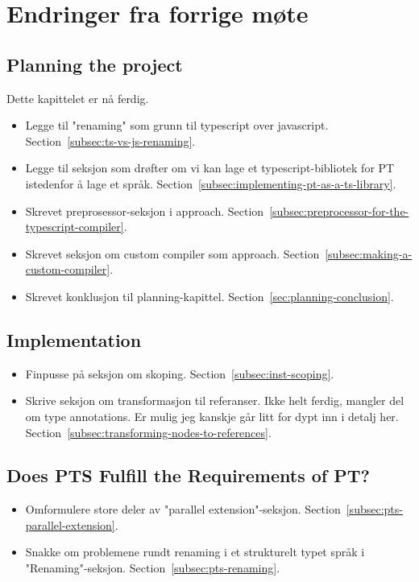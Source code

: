 
\chapter*{Endringer fra forrige møte}

\section*{Planning the project}

Dette kapittelet er nå ferdig.

\begin{itemize}
    \item Legge til "renaming" som grunn til typescript over javascript.
    Section~\vref{subsec:ts-vs-js-renaming}.
    \item Legge til seksjon som drøfter om vi kan lage et typescript-bibliotek for PT istedenfor å lage et språk.
    Section~\vref{subsec:implementing-pt-as-a-ts-library}.
    \item Skrevet preprosessor-seksjon i approach.
    Section~\vref{subsec:preprocessor-for-the-typescript-compiler}.
    \item Skrevet seksjon om custom compiler som approach.
    Section~\vref{subsec:making-a-custom-compiler}.
    \item Skrevet konklusjon til planning-kapittel.
    Section~\vref{sec:planning-conclusion}.
\end{itemize}

\section*{Implementation}

\begin{itemize}
    \item Finpusse på seksjon om skoping.
    Section~\vref{subsec:inst-scoping}.
    \item Skrive seksjon om transformasjon til referanser.
    Ikke helt ferdig, mangler del om type annotations.
    Er mulig jeg kanskje går litt for dypt inn i detalj her.
    Section~\vref{subsec:transforming-nodes-to-references}.
\end{itemize}

\section*{Does PTS Fulfill the Requirements of PT?}

\begin{itemize}
    \item Omformulere store deler av "parallel extension"-seksjon.
    Section~\vref{subsec:pts-parallel-extension}.
    \item Snakke om problemene rundt renaming i et strukturelt typet språk i "Renaming"-seksjon.
    Section~\vref{subsec:pts-renaming}.
\end{itemize}
